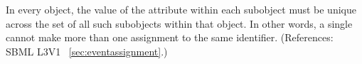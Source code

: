 In every \Event object, the value of the attribute  within
each \EventAssignment subobject must be unique across the set of all such
\EventAssignment subobjects within that \Event object.  In other words, a
single \Event cannot make more than one assignment to the same identifier.
(References: SBML L3V1 ~\ref{sec:eventassignment}.)
